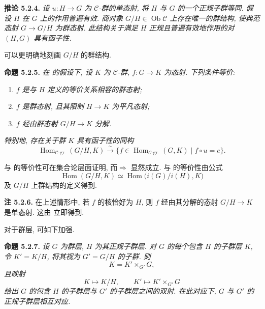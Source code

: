 \medskip
\noindent{}\textbf{推论 5.2.4.}
\textit{设 \(u:H\to G\) 为 \(\mathscr C\)-群的单态射,
将 \(H\) 与 \(G\) 的一个正规子群等同.
假设 \(H\) 在 \(G\) 上的作用普遍有效.
商对象 \(G/H\in\operatorname{Ob}\mathscr C\) 上存在唯一的群结构,
使典范态射 \(G\to G/H\) 为群态射.
此结构关于满足 \(H\) 正规且普遍有效地作用的对 \((H,G)\) 具有函子性.}

可以更明确地刻画 \(G/H\) 的群结构.

\medskip
\noindent{}\textbf{命题 5.2.5.}
\textit{在 的假设下,
设 \(K\) 为 \(\mathscr C\)-群, \(f:G\to K\) 为态射. 下列条件等价:}
\begin{enumerate}
  \item[(i)] \textit{\(f\) 是与 \(H\) 定义的等价关系相容的群态射;}
  \item[(ii)] \textit{\(f\) 是群态射, 且其限制 \(H\to K\) 为平凡态射;}
  \item[(iii)] \textit{\(f\) 经由群态射 \(G/H\to K\) 分解.}
\end{enumerate}
\textit{特别地, 存在关于群 \(K\) 具有函子性的同构}
\[
  \operatorname{Hom}_{\mathscr C\text{-gr.}}(G/H,K)
  \xrightarrow{\sim}
  \bigl\{f\in\operatorname{Hom}_{\mathscr C\text{-gr.}}(G,K)
  \mid f\circ u=e\bigr\}.
\]

 与
的等价性可在集合论层面证明,
而\(\Rightarrow\) 显然成立.
 与
的等价性由公式
\[
  \operatorname{Hom}(G/H,K)
  \simeq \operatorname{Hom}\bigl(i(G)/i(H),K\bigr)
\]
及 \(G/H\) 上群结构的定义得到.

\medskip
\noindent{}\textbf{注 5.2.6.}
在上述情形中, 若 \(f\) 的核恰好为 \(H\),
则 \(f\) 经由其分解的态射 \(G/H\to K\) 是单态射.
这由 立即得到.

对于群层, 可如下加强.

\medskip
\noindent{}\textbf{命题 5.2.7.}
\textit{设 \(G\) 为群层, \(H\) 为其正规子群层.
对 \(G\) 的每个包含 \(H\) 的子群层 \(K\),
令 \(K'=K/H\), 将其视为 \(G'=G/H\) 的子群. 则}
\[
  K=K'\times_{G'}G,
\]
\textit{且映射}
\[
  K\longmapsto K/H,
  \qquad
  K'\longmapsto K'\times_{G'}G
\]
\textit{给出 \(G\) 的包含 \(H\) 的子群层与 \(G'\) 的子群层之间的双射.
在此对应下, \(G\) 与 \(G'\) 的正规子群层相互对应.}

